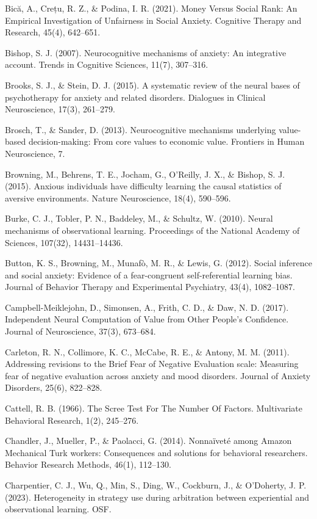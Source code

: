 \documentclass[12pt,a4paper,oneside,]{book} %
\begin{document}
Bică, A., Crețu, R. Z., \& Podina, I. R. (2021). Money Versus Social Rank: An Empirical Investigation of Unfairness in Social Anxiety. Cognitive Therapy and Research, 45(4), 642--651.

Bishop, S. J. (2007). Neurocognitive mechanisms of anxiety: An integrative account. Trends in Cognitive Sciences, 11(7), 307--316.

Brooks, S. J., \& Stein, D. J. (2015). A systematic review of the neural bases of psychotherapy for anxiety and related disorders. Dialogues in Clinical Neuroscience, 17(3), 261--279.

Brosch, T., \& Sander, D. (2013). Neurocognitive mechanisms underlying value-based decision-making: From core values to economic value. Frontiers in Human Neuroscience, 7.

Browning, M., Behrens, T. E., Jocham, G., O'Reilly, J. X., \& Bishop, S. J. (2015). Anxious individuals have difficulty learning the causal statistics of aversive environments. Nature Neuroscience, 18(4), 590--596.

Burke, C. J., Tobler, P. N., Baddeley, M., \& Schultz, W. (2010). Neural mechanisms of observational learning. Proceedings of the National Academy of Sciences, 107(32), 14431--14436.

Button, K. S., Browning, M., Munafò, M. R., \& Lewis, G. (2012). Social inference and social anxiety: Evidence of a fear-congruent self-referential learning bias. Journal of Behavior Therapy and Experimental Psychiatry, 43(4), 1082--1087.

Campbell-Meiklejohn, D., Simonsen, A., Frith, C. D., \& Daw, N. D. (2017). Independent Neural Computation of Value from Other People's Confidence. Journal of Neuroscience, 37(3), 673--684.

Carleton, R. N., Collimore, K. C., McCabe, R. E., \& Antony, M. M. (2011). Addressing revisions to the Brief Fear of Negative Evaluation scale: Measuring fear of negative evaluation across anxiety and mood disorders. Journal of Anxiety Disorders, 25(6), 822--828.

Cattell, R. B. (1966). The Scree Test For The Number Of Factors. Multivariate Behavioral Research, 1(2), 245--276.

Chandler, J., Mueller, P., \& Paolacci, G. (2014). Nonnaïveté among Amazon Mechanical Turk workers: Consequences and solutions for behavioral researchers. Behavior Research Methods, 46(1), 112--130.

Charpentier, C. J., Wu, Q., Min, S., Ding, W., Cockburn, J., \& O'Doherty, J. P. (2023). Heterogeneity in strategy use during arbitration between experiential and observational learning. OSF.
\end{document}
